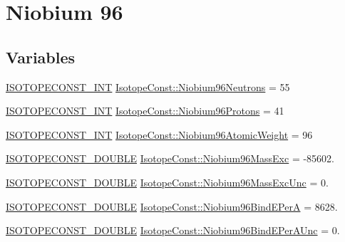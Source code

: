 \hypertarget{group___isotope_const-_niobium-_nb96}{}\section{Niobium 96}
\label{group___isotope_const-_niobium-_nb96}
\subsection*{Variables}
\begin{DoxyCompactItemize}
\item 
\mbox{\hyperlink{group___isotope_const-_macros_ga5f18360b3e99483a35c32d789e62621c}{I\+S\+O\+T\+O\+P\+E\+C\+O\+N\+S\+T\+\_\+\+I\+NT}} \mbox{\hyperlink{group___isotope_const-_niobium-_nb96_gaaac42f7e8cfb831f7b182e6a4121a976}{Isotope\+Const\+::\+Niobium96\+Neutrons}} = 55
\item 
\mbox{\hyperlink{group___isotope_const-_macros_ga5f18360b3e99483a35c32d789e62621c}{I\+S\+O\+T\+O\+P\+E\+C\+O\+N\+S\+T\+\_\+\+I\+NT}} \mbox{\hyperlink{group___isotope_const-_niobium-_nb96_ga7311c4bf45fe135e37ad10cd81cdd8ba}{Isotope\+Const\+::\+Niobium96\+Protons}} = 41
\item 
\mbox{\hyperlink{group___isotope_const-_macros_ga5f18360b3e99483a35c32d789e62621c}{I\+S\+O\+T\+O\+P\+E\+C\+O\+N\+S\+T\+\_\+\+I\+NT}} \mbox{\hyperlink{group___isotope_const-_niobium-_nb96_ga72b351b85d0010c2e1b55522158c8d0e}{Isotope\+Const\+::\+Niobium96\+Atomic\+Weight}} = 96
\item 
\mbox{\hyperlink{group___isotope_const-_macros_ga8f45a7272ce02c0b4c65c44636ed719a}{I\+S\+O\+T\+O\+P\+E\+C\+O\+N\+S\+T\+\_\+\+D\+O\+U\+B\+LE}} \mbox{\hyperlink{group___isotope_const-_niobium-_nb96_ga81d5b284fb4ebb20f6dc575eb6eec8d6}{Isotope\+Const\+::\+Niobium96\+Mass\+Exc}} = -\/85602.
\item 
\mbox{\hyperlink{group___isotope_const-_macros_ga8f45a7272ce02c0b4c65c44636ed719a}{I\+S\+O\+T\+O\+P\+E\+C\+O\+N\+S\+T\+\_\+\+D\+O\+U\+B\+LE}} \mbox{\hyperlink{group___isotope_const-_niobium-_nb96_gadbb599b8ad1b5a642f1a2b8741772e8e}{Isotope\+Const\+::\+Niobium96\+Mass\+Exc\+Unc}} = 0.
\item 
\mbox{\hyperlink{group___isotope_const-_macros_ga8f45a7272ce02c0b4c65c44636ed719a}{I\+S\+O\+T\+O\+P\+E\+C\+O\+N\+S\+T\+\_\+\+D\+O\+U\+B\+LE}} \mbox{\hyperlink{group___isotope_const-_niobium-_nb96_ga79de12c480e59d2d74f26ea1c4f44014}{Isotope\+Const\+::\+Niobium96\+Bind\+E\+PerA}} = 8628.
\item 
\mbox{\hyperlink{group___isotope_const-_macros_ga8f45a7272ce02c0b4c65c44636ed719a}{I\+S\+O\+T\+O\+P\+E\+C\+O\+N\+S\+T\+\_\+\+D\+O\+U\+B\+LE}} \mbox{\hyperlink{group___isotope_const-_niobium-_nb96_gae1e2cfd21f6ad00d23ca65891528465d}{Isotope\+Const\+::\+Niobium96\+Bind\+E\+Per\+A\+Unc}} = 0.

\end{DoxyCompactItemize}
